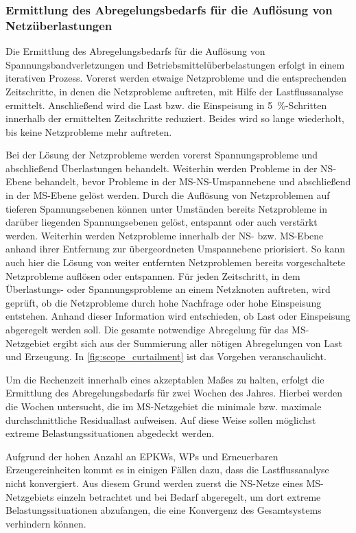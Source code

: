 


\subsubsection{Ermittlung des Abregelungsbedarfs für die Auflösung von Netzüberlastungen}

Die Ermittlung des Abregelungsbedarfs für die Auflösung von Spannungsbandverletzungen und Betriebsmittelüberbelastungen erfolgt in einem iterativen Prozess.
Vorerst werden etwaige Netzprobleme und die entsprechenden Zeitschritte, in denen die Netzprobleme auftreten, mit Hilfe der Lastflussanalyse ermittelt.
Anschließend wird die Last bzw. die Einspeisung in \SI{5}{\percent}-Schritten innerhalb der ermittelten Zeitschritte reduziert.
Beides wird so lange wiederholt, bis keine Netzprobleme mehr auftreten.\medskip

Bei der Lösung der Netzprobleme werden vorerst Spannungsprobleme und abschließend Überlastungen behandelt.
Weiterhin werden Probleme in der \gls{NS}-Ebene behandelt, bevor Probleme in der \gls{MS}-\gls{NS}-Umspannebene und abschließend in der \gls{MS}-Ebene gelöst werden.
Durch die Auflösung von Netzproblemen auf tieferen Spannungsebenen können unter Umständen bereits Netzprobleme in darüber liegenden Spannungsebenen gelöst, entspannt oder auch verstärkt werden.
Weiterhin werden Netzprobleme innerhalb der \gls{NS}- bzw. \gls{MS}-Ebene anhand ihrer Entfernung zur übergeordneten Umspannebene priorisiert.
So kann auch hier die Lösung von weiter entfernten Netzproblemen bereits vorgeschaltete Netzprobleme auflösen oder entspannen.
Für jeden Zeitschritt, in dem Überlastungs- oder Spannungsprobleme an einem Netzknoten auftreten, wird geprüft, ob die Netzprobleme durch hohe Nachfrage oder hohe Einspeisung entstehen.
Anhand dieser Information wird entschieden, ob Last oder Einspeisung abgeregelt werden soll.
Die gesamte notwendige Abregelung für das \gls{MS}-Netzgebiet ergibt sich aus der Summierung aller nötigen Abregelungen von Last und Erzeugung.
In \autoref{fig:scope_curtailment} ist das Vorgehen veranschaulicht. \cite{Schachler}



Um die Rechenzeit innerhalb eines akzeptablen Maßes zu halten, erfolgt die Ermittlung des Abregelungsbedarfs für zwei Wochen des Jahres.
Hierbei werden die Wochen untersucht, die im \gls{MS}-Netzgebiet die minimale bzw. maximale durchschnittliche Residuallast aufweisen.
Auf diese Weise sollen möglichst extreme Belastungssituationen abgedeckt werden.\medskip

Aufgrund der hohen Anzahl an \glspl{EPKW}, \glspl{WP} und Erneuerbaren Erzeugereinheiten kommt es in einigen Fällen dazu, dass die Lastflussanalyse nicht konvergiert.
Aus diesem Grund werden zuerst die \gls{NS}-Netze eines \gls{MS}-Netzgebiets einzeln betrachtet und bei Bedarf abgeregelt, um dort extreme Belastungssituationen abzufangen, die eine Konvergenz des Gesamtsystems verhindern können.

\clearpage
